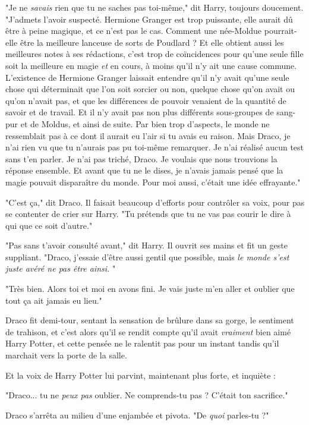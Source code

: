 "Je ne \emph{savais}  rien que tu ne saches pas toi-même," dit Harry, toujours doucement. "J'admets l'avoir suspecté. Hermione Granger est trop puissante, elle aurait dû être à peine magique, et ce n'est pas le cas. Comment une née-Moldue pourrait-elle être la meilleure lanceuse de sorts de Poudlard ? Et elle obtient aussi les meilleures notes à ses rédactions, c'est trop de coïncidences pour qu'une seule fille soit la meilleure en magie \emph{et}  en cours, à moins qu'il n'y ait une cause commune. L'existence de Hermione Granger laissait entendre qu'il n'y avait qu'une seule chose qui déterminait que l'on soit sorcier ou non, quelque chose qu'on avait ou qu'on n'avait pas, et que les différences de pouvoir venaient de la quantité de savoir et de travail. Et il n'y avait pas non plus différents sous-groupes de sang-pur et de Moldus, et ainsi de suite. Par bien trop d'aspects, le monde ne ressemblait pas à ce dont il aurait eu l'air si tu avais eu raison. Mais Draco, je n'ai rien vu que tu n'aurais pas pu toi-même remarquer. Je n'ai réalisé aucun test sans t'en parler. Je n'ai pas triché, Draco. Je voulais que nous trouvions la réponse ensemble. Et avant que tu ne le dises, je n'avais jamais pensé que la magie pouvait disparaître du monde. Pour moi aussi, c'était une idée effrayante."

"C'est ça," dit Draco. Il faisait beaucoup d'efforts pour contrôler sa voix, pour pas se contenter de crier sur Harry. "Tu prétends que tu ne vas pas courir le dire à qui que ce soit d'autre."

"Pas sans t'avoir consulté avant," dit Harry. Il ouvrit ses mains et fit un geste suppliant. "Draco, j'essaie d'être aussi gentil que possible, mais \emph{le monde s'est juste avéré ne pas être ainsi.} "

"Très bien. Alors toi et moi en avons fini. Je vais juste m'en aller et oublier que tout ça ait jamais eu lieu."

Draco fit demi-tour, sentant la sensation de brûlure dans sa gorge, le sentiment de trahison, et c'est alors qu'il se rendit compte qu'il avait \emph{vraiment}  bien aimé Harry Potter, et cette pensée ne le ralentit pas pour un instant tandis qu'il marchait vers la porte de la salle.

Et la voix de Harry Potter lui parvint, maintenant plus forte, et inquiète :

"Draco... tu ne \emph{peux pas}  oublier. Ne comprends-tu pas ? C'était ton sacrifice."

Draco s'arrêta au milieu d'une enjambée et pivota. "De \emph{quoi}  parles-tu ?"

